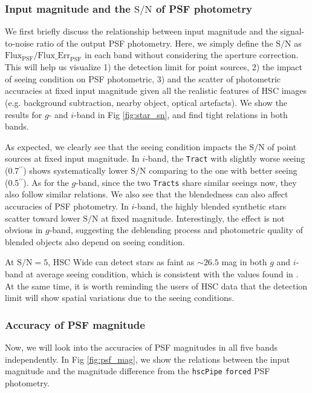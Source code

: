\documentclass[useamsfonts]{pasj01}
\def\asec{$^{\prime\prime}$}
\def\hscpipe{\texttt{hscPipe}}
\def\forced{\texttt{forced}}
\def\tract{\texttt{Tract}}
\def\tracts{\texttt{Tracts}}
\def\s2n{{$\mathrm{S}/\mathrm{N}$}}
\begin{document}
\subsubsection{Input magnitude and the \s2n{} of PSF photometry}

    We first briefly discuss the relationship between input magnitude and the
    signal-to-noise ratio of the output PSF photometry.
    Here, we simply define the \s2n{} as
    $\mathrm{Flux}_{\mathrm{PSF}}/\mathrm{Flux\_Err}_{\mathrm{PSF}}$ in each band
    without considering the aperture correction.
    This will help us visualize
    1) the detection limit for point sources,
    2) the impact of seeing condition on PSF photometric,
    3) and the scatter of photometric accuracies at fixed input magnitude given all
       the realistic features of HSC images (e.g. background subtraction, nearby
       object, optical artefacts).
    We show the results for $g$- and $i$-band in Fig \ref{fig:star_sn}, and find tight
    relations in both bands.

    As expected, we clearly see that the seeing condition impacts the \s2n{} of point
    sources at fixed input magnitude.
    In $i$-band, the \tract{} with slightly worse seeing (0.7\asec{}) shows systematically
    lower \s2n{} comparing to the one with better seeing (0.5\asec{}).
    As for the $g$-band, since the two \tracts{} share similar seeings now, they also
    follow similar relations.
    We also see that the blendedness can also affect accuracies of PSF photometry.
    In $i$-band, the highly blended synthetic stars scatter toward lower \s2n{} at
    fixed magnitude.
    Interestingly, the effect is not obvious in $g$-band, suggesting the deblending
    process and photometric quality of blended objects also depend on seeing condition.

    At \s2n{}$=5$, HSC Wide can detect stars as faint as ${\sim}26.5$ mag in both $g$ and
    $i$-band at average seeing condition, which is consistent with the values found
    in \citet{HSCDR1}.
    At the same time, it is worth reminding the users of HSC data that the detection
    limit will show spatial variations due to the seeing conditions.

\subsubsection{Accuracy of PSF magnitude}

    Now, we will look into the accuracies of PSF magnitudes in all five bands
    independently.
    In Fig \ref{fig:psf_mag}, we show the relations between the input magnitude and the
    magnitude difference from the \hscpipe{} \forced{} PSF photometry.
\end{document}
